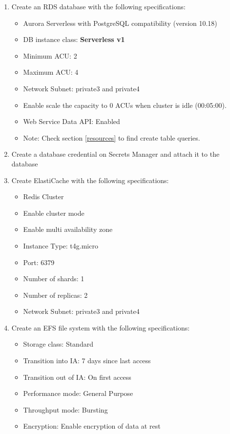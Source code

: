 \documentclass{article}
\begin{document}
\begin{enumerate}
    \item Create an RDS database with the following specifications:
    \begin{itemize}
        \item Aurora Serverless with PostgreSQL compatibility (version 10.18)
        \item DB instance class: \textbf{Serverless v1}
        \item Minimum ACU: 2
        \item Maximum ACU: 4
        \item Network Subnet: private3 and private4
        \item Enable scale the capacity to 0 ACUs when cluster is idle (00:05:00).
        \item Web Service Data API: Enabled
        \item Note: Check section \ref{resources} to find create table queries.
    \end{itemize}
    \item Create a database credential on Secrets Manager and attach it to the database
    \item Create ElastiCache with the following specifications:
    \begin{itemize}
        \item Redis Cluster
        \item Enable cluster mode
        \item Enable multi availability zone
        \item Instance Type: t4g.micro
        \item Port: 6379
        \item Number of shards: 1
        \item Number of replicas: 2
        \item Network Subnet: private3 and private4
    \end{itemize}
    \item Create an EFS file system with the following specifications:
    \begin{itemize}
        \item Storage class: Standard
        \item Transition into IA: 7 days since last access
        \item Transition out of IA: On first access
        \item Performance mode: General Purpose
        \item Throughput mode: Bursting
        \item Encryption: Enable encryption of data at rest

\end{itemize}
\end{enumerate}
\end{document}
